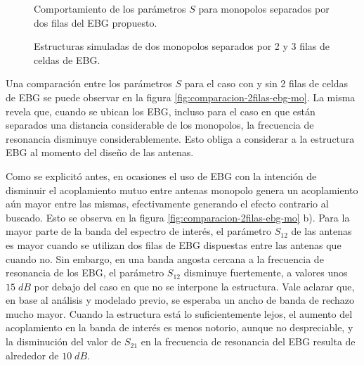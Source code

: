 \begin{figure}[H]
	\centering 
	\hspace{0pt}
	\caption{Comportamiento de los parámetros $S$ para monopolos separados por dos filas del EBG propuesto.}
	\label{fig:parametros-s-2ebg}
\end{figure}

\begin{figure}[H]
	\centering 
	\hspace{0pt}
	\caption{Estructuras simuladas de dos monopolos separados por 2 y 3 filas de celdas de EBG.}
	\label{fig:estructuras2-y-3-ebg-monopolos}
\end{figure} 

Una comparación entre los parámetros $S$ para el caso con y sin 2 filas de celdas de EBG se puede observar en la figura \ref{fig:comparacion-2filas-ebg-mo}. La misma revela que, cuando se ubican los EBG, incluso para el caso en que están separados una distancia considerable de los monopolos, la frecuencia de resonancia disminuye considerablemente. Esto obliga a considerar a la estructura EBG al momento del diseño de las antenas.

Como se explicitó antes, en ocasiones el uso de EBG con la intención de disminuir el acoplamiento mutuo entre antenas monopolo genera un acoplamiento aún mayor entre las mismas, efectivamente generando el efecto contrario al buscado. Esto se observa en la figura \ref{fig:comparacion-2filas-ebg-mo} b). Para la mayor parte de la banda del espectro de interés, el parámetro $S_{12}$ de las antenas es mayor cuando se utilizan dos filas de EBG dispuestas entre las antenas que cuando no. Sin embargo, en una banda angosta cercana a la frecuencia de resonancia de los EBG, el parámetro $S_{12}$ disminuye fuertemente, a valores unos $15\; dB$ por debajo del caso en que no se interpone la estructura. Vale aclarar que, en base al análisis y modelado previo, se esperaba un ancho de banda de rechazo mucho mayor. Cuando la estructura está lo suficientemente lejos, el aumento del acoplamiento en la banda de interés es menos notorio, aunque no despreciable, y la disminución del valor de $S_{21}$ en la frecuencia de resonancia del EBG resulta de alrededor de $10\; dB$.

